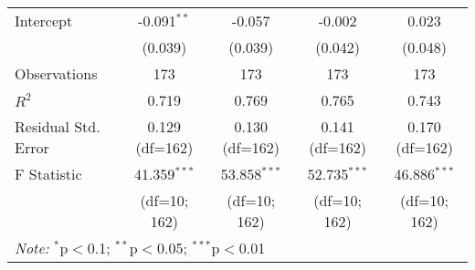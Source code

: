 \begin{table}[H]
\begin{tabular}{@{\extracolsep{5pt}}lcccc}
Intercept & -0.091$^{**}$ & -0.057 & -0.002 & 0.023 \\
          & (0.039) & (0.039) & (0.042) & (0.048) \\

\hline
Observations & 173 & 173 & 173 & 173 \\
$R^2$ & 0.719 & 0.769 & 0.765 & 0.743 \\
Residual Std. Error & 0.129 (df=162) & 0.130 (df=162) & 0.141 (df=162) & 0.170 (df=162) \\
F Statistic & 41.359$^{***}$ & 53.858$^{***}$ & 52.735$^{***}$ & 46.886$^{***}$ \\
            & (df=10; 162) & (df=10; 162) & (df=10; 162) & (df=10; 162) \\
\hline
\hline
\multicolumn{5}{l}{\textit{Note:} $^{*}$p$<$0.1; $^{**}$p$<$0.05; $^{***}$p$<$0.01} \\
\end{tabular}
\end{table}



